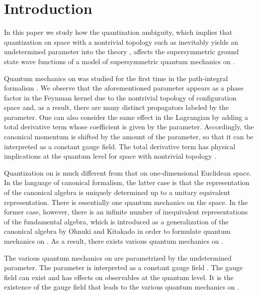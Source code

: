 \documentclass[a4paper,12pt]{article}
\begin{document}
\section{Introduction}
In this paper we study how the quantization ambiguity, which implies 
that quantization on space with a nontrivial topology such 
as \coordHE{} inevitably yields an undetermined parameter 
into the theory \cite{tsutsui}, affects the supersymmetric ground state wave 
functions 
of a model of supersymmetric quantum mechanics on \coordHE{}. 
\par
Quantum mechanics on \coordHE{} was studied for the first time in the path-integral 
formalism \cite{schul1}\cite{laid}. We observe that the aforementioned 
parameter appears as a phase factor in the Feynman kernel due to the 
nontrivial topology of configuration space and, as a result, there 
are many distinct propagators labeled by the parameter. 
One can also consider the same effect in 
the Lagrangian by adding a total derivative term whose coefficient is given 
by the parameter. Accordingly, the canonical momentum is shifted by the 
amount of the parameter, so that it can be interpreted as a constant 
gauge field. The total derivative term has physical implications 
at the quantum level for space with nontrivial topology \cite{schul2}.
\par
Quantization on \coordHE{} is much different from that on one-dimensional
Euclidean space. In the language of canonical formalism, the latter 
case is that the representation of the canonical algebra is uniquely 
determined up to a unitary equivalent representation. There is essentially one 
quantum mechanics on the space. In the former case, however, there is
an infinite number of inequivalent representations of the 
fundamental algebra, which is introduced as a generalization of the canonical
algebra by Ohnuki and Kitakado \cite{ok} in order to formulate 
quantum mechanics on \coordHE{}.
As a result, there exists various quantum mechanics on \coordHE{}.  
\par
The various quantum mechanics on \coordHE{} are parametrized 
by the undetermined parameter. The parameter is interpreted as a 
constant gauge field \cite{ok}\cite{tanimura}. 
The gauge field can exist and has effects on observables at the 
quantum level. It is the existence of the gauge field that leads to the  
various quantum mechanics on \coordHE{}. 
\end{document}

